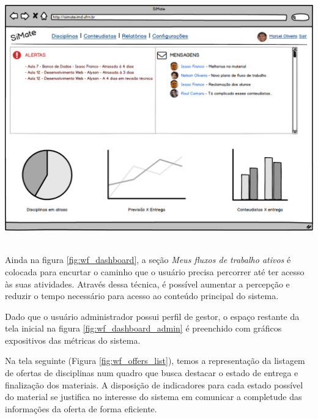 \vspace{5mm}
\begin{minipage}[c]{\textwidth}
    \includegraphics[width=15cm]{Wireframes/DashboardAdmin.png}
	\label{fig:wf_dashboard_admin}
\end{minipage} \\

Ainda na figura \hyperref[fig:wf_dashboard]{\ref{fig:wf_dashboard}}, a seção \textit{Meus fluxos de trabalho ativos} é colocada para encurtar o caminho que o usuário precisa percorrer até ter acesso às suas atividades. Através dessa técnica, é possível aumentar a percepção e reduzir o tempo necessário para acesso ao conteúdo principal do sistema.

Dado que o usuário administrador possui perfil de gestor, o espaço restante da tela inicial na figura \hyperref[fig:wf_dashboard_admin]{\ref{fig:wf_dashboard_admin}} é preenchido com gráficos expositivos das métricas do sistema.

Na tela seguinte (Figura \hyperref[fig:wf_offers_list]{\ref{fig:wf_offers_list}}), temos a representação da listagem de ofertas de disciplinas num quadro que busca destacar o estado de entrega e finalização dos materiais. A disposição de indicadores para cada estado possível do material se justifica no interesse do sistema em comunicar a completude das informações da oferta de forma eficiente.

